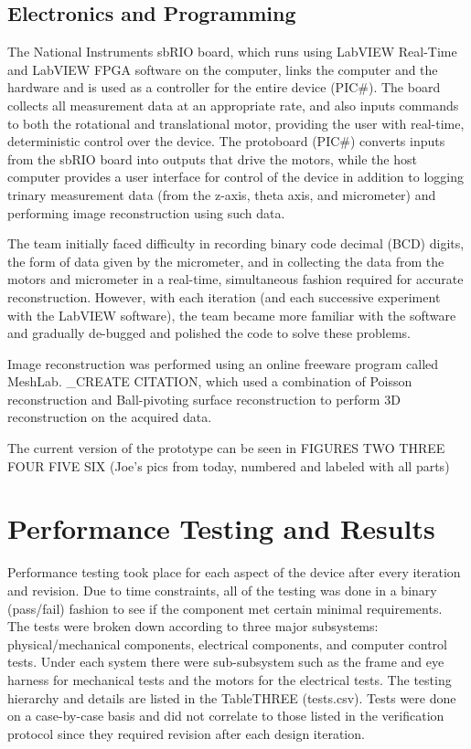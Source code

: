 \documentclass{article}
\begin{document}
\subsection{Electronics and Programming}
\label{sec:electronics}

The National Instruments sbRIO board, which runs using LabVIEW Real-Time and LabVIEW FPGA software on the computer, links the computer and the hardware and is used as a controller for the entire device (PIC#). The board collects all measurement data at an appropriate rate, and also inputs commands to both the rotational and translational motor, providing the user with real-time, deterministic control over the device. The protoboard (PIC#) converts inputs from the sbRIO board into outputs that drive the motors, while the host computer provides a user interface for control of the device in addition to logging trinary measurement data (from the z-axis, theta axis, and micrometer) and performing image reconstruction using such data. 

The team initially faced difficulty in recording binary code decimal (BCD) digits, the form of data given by the micrometer, and in collecting the data from the motors and micrometer in a real-time, simultaneous fashion required for accurate reconstruction. However, with each iteration (and each successive experiment with the LabVIEW software), the team became more familiar with the software and gradually de-bugged and polished the code to solve these problems. 

	Image reconstruction was performed using an online freeware program called MeshLab. \citeMESHLAB_CREATE CITATION, which used a combination of Poisson reconstruction and Ball-pivoting surface reconstruction to perform 3D reconstruction on the acquired data. 

The current version of the prototype can be seen in FIGURES  TWO THREE FOUR FIVE SIX (Joe’s pics from today, numbered and labeled with all parts)

\section{Performance Testing and Results}
\label{sec:perf-test-results}

Performance testing took place for each aspect of the device after every iteration and revision. Due to time constraints, all of the testing was done in a binary (pass/fail) fashion to see if the component met certain minimal requirements. The tests were broken down according to three major subsystems: physical/mechanical components, electrical components, and computer control tests. Under each system there were sub-subsystem such as the frame and eye harness for mechanical tests and the motors for the electrical tests. The testing hierarchy and details are listed in the TableTHREE (tests.csv). Tests were done on a case-by-case basis and did not correlate to those listed in the verification protocol since they required revision after each design iteration. 
	
\end{document}
